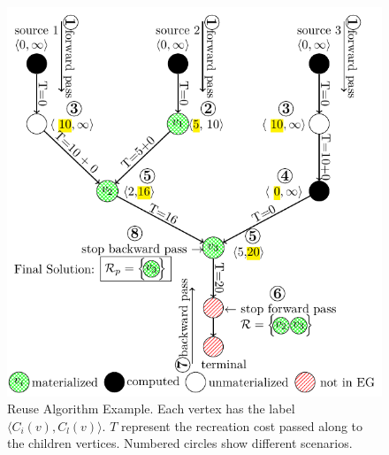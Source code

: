 \begin{figure}[t]
\centering
\includegraphics[width=\linewidth]{../images/tikz-standalone/reuse-algorithm}
\caption{Reuse Algorithm Example. Each vertex has the label $\langle C_i(v),C_l(v) \rangle$. $T$ represent the recreation cost passed along to the children vertices. Numbered circles show different scenarios.}
\label{fig-reuse-algorithm}
\vspace{-4mm}
\end{figure}

